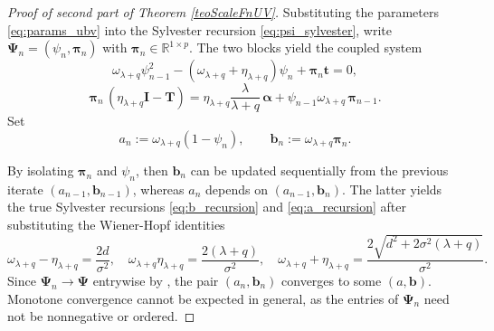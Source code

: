 \documentclass[a4paper,11pt]{article}
\numberwithin{equation}{section}
\theoremstyle{plain}
\theoremstyle{definition}
\newcommand{\1}{\mathbf{1}}
\begin{document}
\begin{proof}[Proof of second part of Theorem \ref{teoScaleFnUV}]
Substituting the parameters \eqref{eq:params_ubv} into the Sylvester recursion \eqref{eq:psi_sylvester}, write $\bm{\Psi}_n=(\psi_n,\bm{\pi}_n)$ with $\bm{\pi}_n\in\mathbb{R}^{1\times p}$. The two blocks yield the coupled system
\begin{equation}\label{eq:sylvester_ubv_scalar1}
\omega_{\lambda+q}\psi^2_{n-1}-(\omega_{\lambda+q}+\eta_{\lambda+q})\psi_n+\bm \pi_n\bm t=0,
\end{equation}
\begin{equation}\label{eq:sylvester_ubv_vector1}
\bm{\pi}_n\,(\eta_{\lambda+q} \bm{I}-\bm{T}) = \eta_{\lambda+q}\frac{\lambda}{\lambda+q}\,\bm{\alpha} + \psi_{n-1}\omega_{\lambda+q}\,\bm{\pi}_{n-1}.
\end{equation}
Set
\begin{equation}\label{eq:ab_def1}
a_n:=\omega_{\lambda+q}(1-\psi_n),\qquad \bm{b}_n:=\omega_{\lambda+q}\bm{\pi}_n.
\end{equation}

By isolating $\bm{\pi}_n$ and $\psi_n$, then $\bm{b}_n$ can be updated sequentially from the previous iterate $(a_{n-1},\bm{b}_{n-1})$, whereas $a_n$ depends on $(a_{n-1},\bm{b}_{n})$. The latter yields the true Sylvester recursions \eqref{eq:b_recursion} and \eqref{eq:a_recursion} after substituting the Wiener-Hopf identities
\begin{equation}\label{eq:wh_identities}
\omega_{\lambda+q} - \eta_{\lambda+q} = \frac{2d}{\sigma^2}, \quad
\omega_{\lambda+q}\eta_{\lambda+q} = \frac{2(\lambda+q)}{\sigma^2}, \quad \omega_{\lambda+q} + \eta_{\lambda+q} = \frac{2\sqrt{d^2+2\sigma^2(\lambda+q)}}{\sigma^2}.
\end{equation}
Since $\bm{\Psi}_n \to \bm{\Psi}$ entrywise by \cite[Corollary 4.2]{BeanNguyenNielsenPeralta2022}, the pair $(a_n, \bm{b}_n)$ converges to some $(a, \bm{b})$. Monotone convergence cannot be expected in general, as the entries of $\bm{\Psi}_n$ need not be nonnegative or ordered.


\end{proof}
\end{document}
